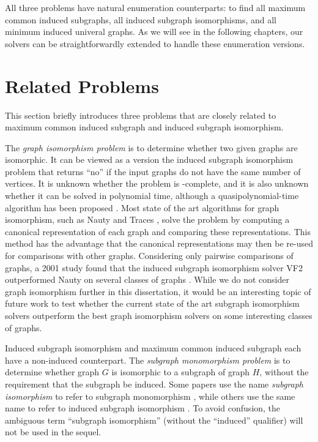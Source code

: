 All three problems have natural enumeration counterparts:
to find all maximum common induced subgraphs, all induced subgraph isomorphisms,
and all minimum induced univeral graphs.  As we will see in the following
chapters, our solvers can be straightforwardly extended to handle
these enumeration versions.

\section{Related Problems}\label{sec:related-problems}

This section briefly introduces three problems that are closely related to
maximum common induced subgraph and induced subgraph isomorphism.

The \emph{graph isomorphism problem} is to determine whether two given graphs are
isomorphic. It can be viewed as a version the induced subgraph isomorphism
problem that returns ``no'' if the input graphs do not have the same number of
vertices.  It is unknown whether the problem is \NP-complete, and it is also
unknown whether it can be solved in polynomial time, although a
quasipolynomial-time algorithm has been proposed
\citep{DBLP:conf/stoc/Babai16}.  Most state of the art algorithms for graph
isomorphism, such as Nauty and Traces \citep{McKay201494}, solve the problem by computing a
canonical representation of each graph and comparing these representations.
This method has the advantage that the canonical
representations may then be re-used for comparisons with other graphs.
Considering only pairwise comparisons of graphs, a 2001 study found that the
induced subgraph isomorphism solver VF2 outperformed Nauty on several classes
of graphs \citep{foggia2001performance}.  While we do not consider graph
isomorphism further in this dissertation, it would be an interesting topic of
future work to test whether the current state of the art subgraph isomorphism
solvers outperform the best graph isomorphism solvers on some interesting
classes of graphs.

Induced subgraph isomorphism and maximum common induced subgraph each have a
non-induced counterpart. The \emph{subgraph monomorphism problem} is to
determine whether graph $G$ is isomorphic to a subgraph of graph $H$, without
the requirement that the subgraph be induced.  Some papers use the name
\emph{subgraph isomorphism} to refer to subgraph monomorphism
\citep{DBLP:conf/cp/McCreeshP15}, while others use the same name to refer to induced
subgraph isomorphism \citep{DBLP:journals/pami/CarlettiFSV18}.  To avoid
confusion, the ambiguous term ``subgraph isomorphism'' (without the ``induced''
qualifier) will not be used in the sequel.

